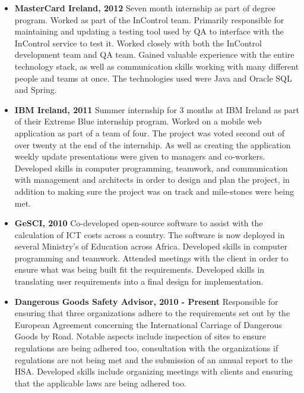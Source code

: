 \documentclass{res}
\begin{document}
\begin{resume}
\begin{itemize}
    \item{{\bf MasterCard Ireland, 2012}} Seven month internship as part of degree program. Worked as part of the InControl team. Primarily responsible for maintaining and updating a testing tool used by QA to interface with the InControl service to test it. Worked closely with both the InControl development team and QA team. Gained valuable experience with the entire technology stack, as well as communication skills working with many different people and teams at once. The technologies used were Java and Oracle SQL and Spring.\\
   
     
    \item{{\bf IBM Ireland, 2011}} Summer internship for 3 months at IBM Ireland as part of their Extreme Blue internship program. Worked on a mobile web application as part of a team of four. The project was voted second out of over twenty at the end of the internship. As well as creating the application weekly update presentations were given to managers and co-workers. Developed skills in computer programming, teamwork, and communication with management and architects in order to design and plan the project, in addition to making sure the project was on track and mile-stones were being met.\\
    
 
    \item{{\bf GeSCI, 2010}} Co-developed open-source software to assist with the calculation of ICT costs across a country. The software is now deployed in several Ministry's of Education across Africa. Developed skills in computer programming and teamwork. Attended meetings with the client in order to ensure what was being built fit the requirements. Developed skills in translating user requirements into a final design for implementation.\\

    \item{{\bf Dangerous Goods Safety Advisor, 2010 - Present}} Responsible for ensuring that three organizations adhere to the requirements set out by the European Agreement concerning the International Carriage of Dangerous Goods by Road. Notable aspects include inspection of sites to ensure regulations are being adhered too, consultation with the organizations if regulations are not being met and the submission of an annual report to the HSA. Developed skills include organizing meetings with clients and ensuring that the applicable laws are being adhered too.\\
 

\end{itemize}
\end{resume}
\end{document}
